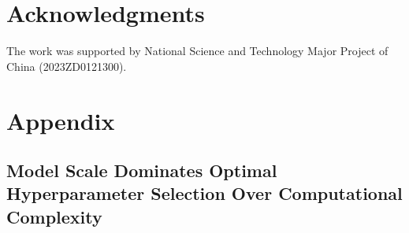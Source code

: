 \documentclass[11pt]{article}
\begin{document}
\section*{Acknowledgments}
The work was supported by National Science and Technology Major Project of China (2023ZD0121300).

    
    
    
    \appendix
    \section{Appendix}
    \label{sec:appendix}

    \subsection{Model Scale Dominates Optimal Hyperparameter Selection Over
    Computational Complexity}
\end{document}
